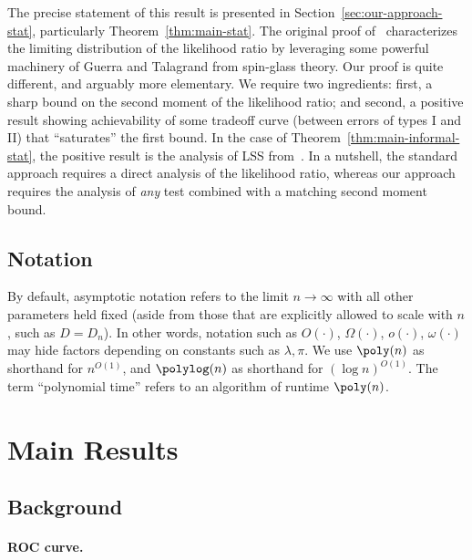 \documentclass[11pt]{article}
\begin{document}
\noindent The precise statement of this result is presented in Section~\ref{sec:our-approach-stat}, particularly Theorem~\ref{thm:main-stat}. The original proof of~\cite{fund-limits-wigner} characterizes the limiting distribution of the likelihood ratio by leveraging some powerful machinery of Guerra and Talagrand from spin-glass theory. Our proof is quite different, and arguably more elementary. We require two ingredients: first, a sharp bound on the second moment of the likelihood ratio; and second, a positive result showing achievability of some tradeoff curve (between errors of types I and II) that ``saturates'' the first bound. In the case of Theorem~\ref{thm:main-informal-stat}, the positive result is the analysis of LSS from~\cite{weak-wigner}. In a nutshell, the standard approach requires a direct analysis of the likelihood ratio, whereas our approach requires the analysis of \emph{any} test combined with a matching second moment bound.




\subsection*{Notation}

By default, asymptotic notation refers to the limit $n \to \infty$ with all other parameters held fixed (aside from those that are explicitly allowed to scale with $n$, such as $D = D_n$). In other words, notation such as $O(\cdot)$, $\Omega(\cdot)$, $o(\cdot)$, $\omega(\cdot)$ may hide factors depending on constants such as $\lambda,\pi$. We use $\poly(n)$ as shorthand for $n^{O(1)}$, and $\polylog(n)$ as shorthand for $(\log n)^{O(1)}$. The term ``polynomial time'' refers to an algorithm of runtime $\poly(n)$.



\section{Main Results}

\subsection{Background}
\label{sec:background}

\paragraph{ROC curve.}
\end{document}
